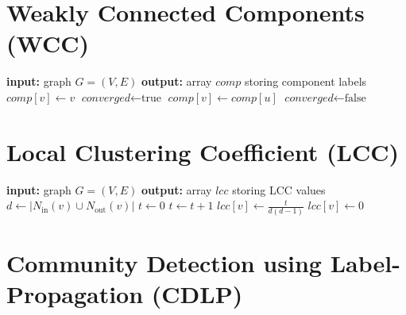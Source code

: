 \clearpage

\section{Weakly Connected Components (WCC)}

\begin{algorithm}[h!]
\begin{algorithmic}[1]
\Statex \textbf{input:} graph $G=(V,E)$
\Statex \textbf{output:} array $\textit{comp}$ storing component labels
  \State $\textit{comp}[v] \gets v$
\EndFor
\Repeat
\State $\textit{converged} \gets \text{true}$
      \State $\textit{comp}[v] \gets \textit{comp}[u]$
      \State $\textit{converged} \gets \text{false}$
     \EndIf
  \EndFor
\EndFor
{}
\end{algorithmic}
\end{algorithm}


\section{Local Clustering Coefficient (LCC)}

\begin{algorithm}[h!]
\begin{algorithmic}[1]
\Statex \textbf{input:} graph $G=(V,E)$
\Statex \textbf{output:} array $\textit{lcc}$ storing LCC values
   \State $d \gets |N_\mathrm{in}(v) \cup N_\mathrm{out}(v)|$
  \State $t \gets 0$
      \State $t  \gets t + 1$
     \EndIf
    \EndFor
  \EndFor
    \State $\textit{lcc}[v] \gets \frac{t}{d(d-1)} $
  \Else
    \State $\textit{lcc}[v] \gets 0$
  \EndIf
\EndFor
\end{algorithmic}
\end{algorithm}

\clearpage

\section{Community Detection using Label-Propagation (CDLP)}

